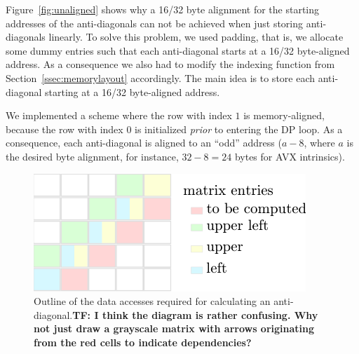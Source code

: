 \documentclass[runningheads,a4paper]{llncs}
\begin{document}
Figure~\ref{fig:unaligned} shows why a 16/32 byte alignment for the starting addresses of the anti-diagonals can not be achieved when just
storing anti-diagonals linearly. To solve this problem, we used padding, that is, we allocate some dummy entries such that
each anti-diagonal starts at a 16/32 byte-aligned address.
As a consequence we also had to modify the indexing function from Section~\ref{ssec:memorylayout} accordingly.
The main idea is to store each anti-diagonal starting at a 16/32 byte-aligned address.



We implemented a scheme where the row with index $1$ is memory-aligned, because the row with index $0$ is initialized {\em prior} to entering the DP loop.
As a consequence, each anti-diagonal is aligned to an ``odd'' address ($a - 8$, where $a$ is the desired byte alignment, for instance, $32 - 8 = 24$ bytes for AVX intrinsics).


\begin{figure}[ht!]
  \centering
  \includegraphics[scale=1.1]{figures/alignment.pdf} \caption{Outline of the
  data accesses required for calculating an anti-diagonal.\textbf{TF: I think
  the diagram is rather confusing. Why not just draw a grayscale matrix with
  arrows originating from the red cells to indicate dependencies? }}
  \label{fig:alignment}
\end{figure}
\end{document}
